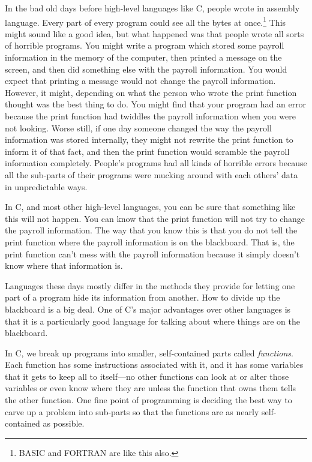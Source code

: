     In the bad old days before high-level languages like C, people wrote
in assembly language.  Every part of every program could see all the
bytes at once.\footnote{BASIC and FORTRAN are like this also.} This
might sound like a good idea, but what happened was that people wrote
all sorts of horrible programs.  You might write a program which stored
some payroll information in the memory of the computer, then printed a
message on the screen, and then did something else with the payroll
information.  You would expect that printing a message would not change
the payroll information.  However, it might, depending on what the
person who wrote the print function thought was the best thing to do.
You might find that your program had an error because the print function
had twiddles the payroll information when you were not looking.  Worse
still, if one day someone changed the way the payroll information was
stored internally, they might not rewrite the print function to inform
it of that fact, and then the print function would scramble the payroll
information completely.  People's programs had all kinds of horrible
errors because all the sub-parts of their programs were mucking around
with each others' data in unpredictable ways.

    In C, and most other high-level languages, you can be sure that
something like this will not happen. You can know that the print
function will not try to change the payroll information.  The way that
you know this is that you do not tell the print function where the
payroll information is on the blackboard.  That is, the print function
can't mess with the payroll information because it simply doesn't know
where that information is.

    Languages these days mostly differ in the methods they provide for
letting one part of a program hide its information from another.  How to
divide up the blackboard is a big deal.  One of C's major advantages
over other languages is that it is a particularly good language for
talking about where things are on the blackboard.

    In C, we break up programs into smaller, self-contained parts called
{\em functions}.  Each function has some instructions associated with
it, and it has some variables that it gets to keep all to itself---no
other functions can look at or alter those variables or even know where
they are unless the function that owns them tells the other function.
One fine point of programming is deciding the best way to carve up a
problem into sub-parts so that the functions are as nearly
self-contained as possible.

